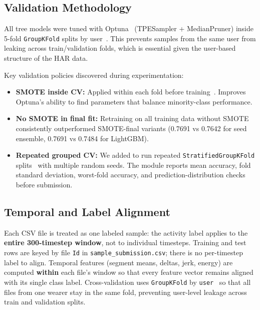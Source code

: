 \documentclass[12pt, a4paper]{article}
\newcommand{\filepath}[1]{\texttt{\seqsplit{#1}}}
\begin{document}
\subsection{Validation Methodology}

All tree models were tuned with Optuna~\cite{akiba2019optuna} (TPESampler + MedianPruner) inside 5-fold \texttt{GroupKFold} splits by user~\cite{pedregosa2011sklearn}. This prevents samples from the same user from leaking across train/validation folds, which is essential given the user-based structure of the HAR data.

Key validation policies discovered during experimentation:

\begin{itemize}
    \item \textbf{SMOTE inside CV:} Applied within each fold before training~\cite{chawla2002smote}. Improves Optuna's ability to find parameters that balance minority-class performance.
    \item \textbf{No SMOTE in final fit:} Retraining on all training data without SMOTE consistently outperformed SMOTE-final variants (0.7691 vs 0.7642 for seed ensemble, 0.7691 vs 0.7484 for LightGBM).
    \item \textbf{Repeated grouped CV:} We added \filepath{model/validation.py} to run repeated \texttt{StratifiedGroupKFold} splits~\cite{pedregosa2011sklearn} with multiple random seeds. The module reports mean accuracy, fold standard deviation, worst-fold accuracy, and prediction-distribution checks before submission.
\end{itemize}

\subsection{Temporal and Label Alignment}

Each CSV file is treated as one labeled sample: the activity label applies to the \textbf{entire 300-timestep window}, not to individual timesteps. Training and test rows are keyed by file \texttt{Id} in \texttt{sample\_submission.csv}; there is no per-timestep label to align. Temporal features (segment means, deltas, jerk, energy) are computed \textbf{within} each file's window so that every feature vector remains aligned with its single class label. Cross-validation uses \texttt{GroupKFold} by \texttt{user}~\cite{pedregosa2011sklearn} so that all files from one wearer stay in the same fold, preventing user-level leakage across train and validation splits.
\end{document}
